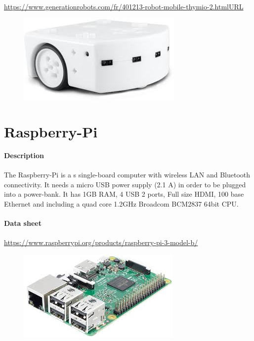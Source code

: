 \documentclass[12pt]{report}
\begin{document}
\paragraph{}
\url{https://www.generationrobots.com/fr/401213-robot-mobile-thymio-2.htmlURL}
\begin{figure}[H]
	\begin{center}
		\includegraphics[scale=0.6]{res/thymio.jpg}
	\end{center}
\end{figure}
\section{Raspberry-Pi}
\textbf{Description}
\paragraph{}
The Raspberry-Pi is a s single-board computer with wireless LAN and Bluetooth connectivity. It needs a micro USB power supply (2.1 A) in order to be plugged into a power-bank. It has 1GB RAM, 4 USB 2 ports, Full size HDMI, 100 base Ethernet and including a quad core 1.2GHz Broadcom BCM2837 64bit CPU.\\ \\
\textbf{Data sheet} 
\paragraph{}
\url{https://www.raspberrypi.org/products/raspberry-pi-3-model-b/}
\begin{figure}[H]
	\begin{center}
		\includegraphics[scale=0.6]{res/raspberry.jpg}
	\end{center}
\end{figure}
\end{document}
